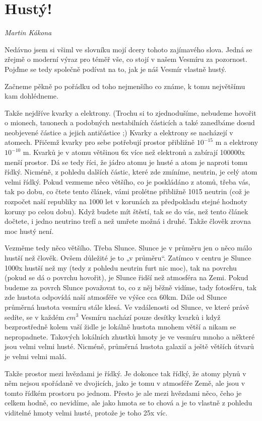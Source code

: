 \documentclass[10pt,a5paper,twoside]{book}
\newcommand{\nadpis}[2]{
\section*{#1}
	\begin{flushright}
	\textit{#2}
	\end{flushright}
}
\begin{document}
\nadpis{Hustý!}{Martin Kákona}
Nedávno jsem si všiml ve slovníku mojí dcery tohoto zajímavého slova. Jedná se zřejmě o moderní výraz pro téměř vše, co stojí v našem Vesmíru za pozornost. Pojďme se tedy společně podívat na to, jak je náš Vesmír vlastně hustý.
\par
Začneme pěkně po pořádku od toho nejmenšího co známe, k tomu největšímu kam dohlédneme. 
\par
Takže nejdříve kvarky a elektrony. (Trochu si to zjednodušíme, nebudeme hovořit o mionech, tauonech a podobných nestabilních částicích a také zanedbáme dosud neobjevené částice a jejich antičástice ;) Kvarky a elektrony se nacházejí v atomech. Přičemž kvarky pro sebe potřebují prostor přibližně $10^{-15}$ m a elektrony $10^{-10}$ m. Kvarků je v atomu většinou 6x více než elektronů a zabírají 100000x menší prostor. Dá se tedy říci, že jádro atomu je husté a atom je naproti tomu řídký. Nicméně, z pohledu dalších částic, které zde zmíníme, neutrin, je celý atom velmi řídký. Pokud vezmeme něco většího, co je poskládáno z atomů, třeba vás, tak po dobu, co čtete tento článek, vámi prolétne přibližně 1015 neutrin (což je rozpočet naší republiky na 1000 let v korunách za předpokladu stejné hodnoty koruny po celou dobu). Když budete mít štěstí, tak se do vás, než tento článek dočtete, i jedno neutrino trefí a než umřete možná i druhé. Takže člověk zrovna moc hustý není.
\par
Vezměme tedy něco většího. Třeba Slunce. Slunce je v průměru jen o něco málo hustší než člověk. Ovšem důležité je to „v průměru“. Zatímco v centru je Slunce 1000x hustší než my (tedy z pohledu neutrin furt nic moc), tak na povrchu (pokud se dá o povrchu hovořit), je Slunce řidší než atmosféra na Zemi. Pokud budeme za povrch Slunce považovat to, co z něj běžně vidíme, tady fotosféru, tak zde hustota odpovídá naší atmosféře ve výšce cca 60km. 
Dále od Slunce průměrná hustota vesmíru stále klesá. Ve vzdálenosti od Slunce, ve které právě sedíte, se v každém $cm^{3}$ Vesmíru nachází pouze desítky kvarků i když bezprostředně kolem vaší židle je lokálně hustota mnohem větší a nikam se nepropadnete. Takových lokálních zhustků hmoty je ve vesmíru mnoho a některé jsou velmi velmi husté. Nicméně, průměrná hustota galaxií a ještě větších útvarů je velmi velmi malá. 
\par
Takže prostor mezi hvězdami je řídký. Je dokonce tak řídký, že atomy plynů v něm nejsou spořádaně ve dvojicích, jako je tomu v atmosféře Země, ale jsou v tomto řídkém prostoru po jednom. Přesto je ale mezi hvězdami něco, čeho je celkem hodně, co nevidíme, ale jako hmota se to chová a je to vlastně z pohledu viditelné hmoty velmi husté, protože je toho 25x víc.
\end{document}
